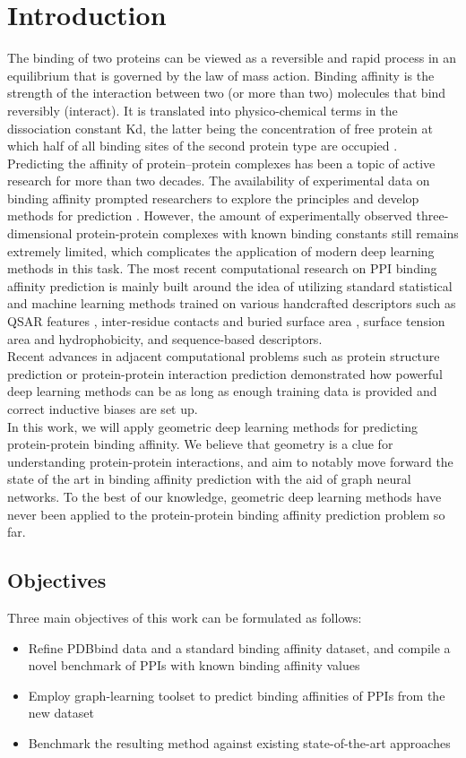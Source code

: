 \section{Introduction}
The binding of two proteins can be viewed as a reversible and rapid process in an equilibrium that is
governed by the law of mass action. Binding affinity is the strength of the interaction between two
(or more than two) molecules that bind reversibly (interact). It is translated into physico-chemical
terms in the dissociation constant Kd, the latter being the concentration of free protein at which
half of all binding sites of the second protein type are occupied \cite{Kastritis}. \\
Predicting the affinity of protein–protein complexes has been a topic of active research for more
than two decades. The availability of experimental data on binding affinity prompted researchers to
explore the principles and develop methods for prediction \cite{Gromiha}. However, the amount of experimentally
observed three-dimensional protein-protein complexes with known binding constants still remains
extremely limited, which complicates the application of modern deep learning methods in this
task. The most recent computational research on PPI binding affinity prediction is mainly built
around the idea of utilizing standard statistical and machine learning methods
trained on various handcrafted descriptors such as QSAR features \cite{Yang}, inter-residue contacts and
buried surface area , surface tension area and hydrophobicity, and sequence-based descriptors. \\
Recent advances in adjacent computational problems such as protein structure prediction or
protein-protein interaction prediction demonstrated how powerful deep learning methods can
be as long as enough training data is provided and correct inductive biases are set up. \\
In this work, we will apply geometric deep learning methods for predicting protein-protein binding
affinity. We believe that geometry is a clue for understanding protein-protein interactions, and aim
to notably move forward the state of the art in binding affinity prediction with the aid of graph
neural networks. To the best of our knowledge, geometric deep learning methods have never been
applied to the protein-protein binding affinity prediction problem so far.
\subsection{Objectives}
Three main objectives of this work can be formulated as follows:
\begin{itemize}
\item Refine PDBbind \cite{database} data and a standard binding affinity dataset, and compile a novel
benchmark of PPIs with known binding affinity values
\item Employ graph-learning toolset to predict binding affinities of PPIs from the new dataset
\item Benchmark the resulting method against existing state-of-the-art approaches
\end{itemize}

